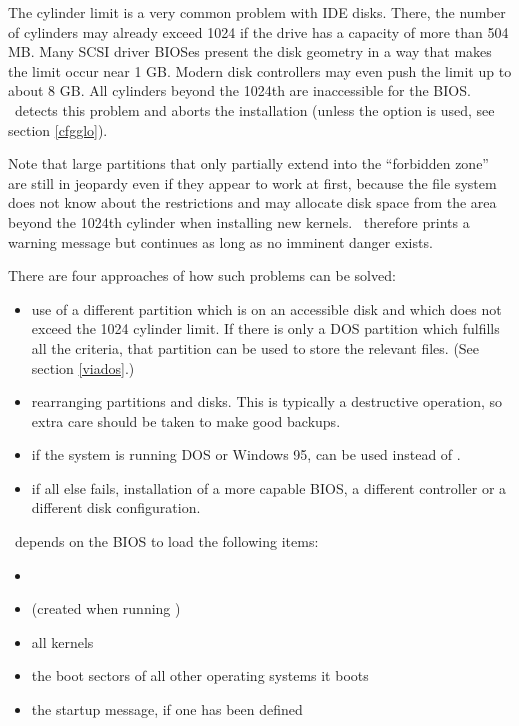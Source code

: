 The cylinder limit is a very common problem with IDE disks. There, the
number of cylinders may already exceed 1024 if the drive has a capacity
of more than 504 MB. Many SCSI driver BIOSes present the disk geometry
in a way that makes the limit occur near 1 GB. Modern disk controllers
may even push the limit up to about 8 GB. All cylinders beyond the
1024th are inaccessible for the BIOS. \LILO\ detects this problem and
aborts the installation (unless the  option is used, see
section \ref{cfgglo}).

Note that large partitions that only partially extend into the ``forbidden
zone'' are still in jeopardy even if they appear to work at first, because
the file system does not know about the restrictions and may allocate
disk space from the area beyond the 1024th cylinder when installing new
kernels. \LILO\ therefore prints a warning message but continues as long
as no imminent danger exists.

There are four approaches of how such problems can be solved:
\begin{itemize}
  \item use of a different partition which is on an accessible disk and
    which does not exceed the 1024 cylinder limit. If there is only a DOS
    partition which fulfills all the criteria, that partition can be
    used to store the relevant files. (See section \ref{viados}.)
  \item rearranging partitions and disks. This is typically a destructive
    operation, so extra care should be taken to make good backups.
  \item if the system is running DOS or Windows 95,  can be
    used instead of \LILO.
  \item if all else fails, installation of a more capable BIOS, a different
    controller or a different disk configuration.
\end{itemize}

\LILO\ depends on the BIOS to load the following items:
\begin{itemize}
  \item {}
  \item {} (created when running )
  \item all kernels
  \item the boot sectors of all other operating systems it boots
  \item the startup message, if one has been defined
\end{itemize}


